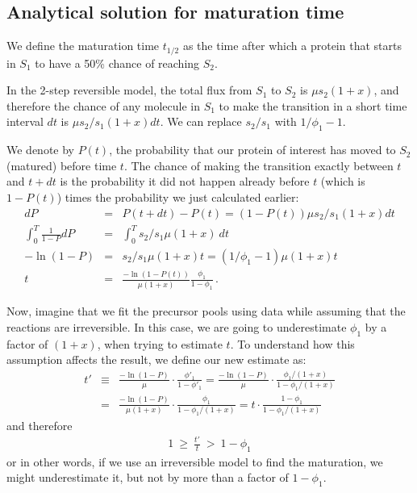 \documentclass{article}
\begin{document}
\subsection{Analytical solution for maturation time}
We define the maturation time $t_{1/2}$ as the time after which a protein that starts in $S_1$ to have a 50\% chance of reaching $S_2$. 

In the 2-step reversible model, the total flux from $S_1$ to $S_2$ is $\mu s_2 (1+x)$, and therefore the chance of any molecule in $S_1$ to make the transition in a short time interval $dt$ is $\mu s_2/s_1 (1+x) dt$. We can replace $s_2/s_1$ with $1/\phi_1 - 1$.

We denote by $P(t)$, the probability that our protein of interest has moved to $S_2$ (matured) before time $t$. The chance of making the transition exactly between $t$ and $t+dt$ is the probability it did not happen already before $t$ (which is $1 - P(t)$) times the probability we just calculated earlier:
\begin{eqnarray}
    dP &=& P(t + dt) - P(t) = \left(1 - P(t)\right) \mu s_2/s_1 (1+x) dt \\
    \int_0^T \frac{1}{1-P} dP &=& \int_0^T s_2/s_1 \mu (1+x)~dt  \\
    -\ln(1-P) &=& s_2/s_1 \mu (1+x)t = (1/\phi_1 - 1)\mu (1+x)t  \\
    t &=& \frac{-\ln(1-P(t))}{\mu (1+x)} \frac{\phi_1}{1 - \phi_1}\,.
\end{eqnarray}

Now, imagine that we fit the precursor pools using data while assuming that the reactions are irreversible. In this case, we are going to underestimate $\phi_1$ by a factor of $(1+x)$, when trying to estimate $t$. To understand how this assumption affects the result, we define our new estimate as:
\begin{eqnarray}
    t' &\equiv& \frac{-\ln(1-P)}{\mu} \cdot \frac{\phi'_1}{1 - \phi'_1} 
    = \frac{-\ln(1-P)}{\mu} \cdot \frac{\phi_1/(1+x)}{1 - \phi_1/(1+x)} \nonumber\\
    &=& \frac{-\ln(1-P)}{\mu (1+x)} \cdot \frac{\phi_1}{1 - \phi_1/(1+x)} 
    = t \cdot \frac{1 - \phi_1}{1 - \phi_1/(1+x)}
\end{eqnarray}
and therefore
\begin{eqnarray}
    1 ~\geq~ \frac{t'}{t} ~>~ 1-\phi_1
\end{eqnarray}
or in other words, if we use an irreversible model to find the maturation, we might underestimate it, but not by more than a factor of $1-\phi_1$.
\end{document}
